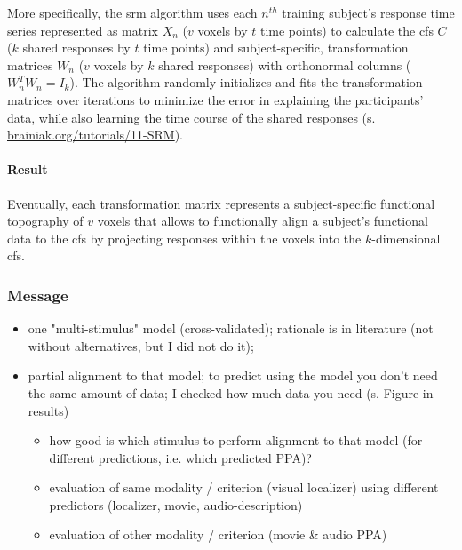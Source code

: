 More specifically, the \ac{srm} algorithm uses each $n^{th}$ training subject's
response time series represented as matrix $X_{n}$ ({$v$} voxels by $t$ time
points) to calculate the \ac{cfs} $C$ ($k$ shared responses by $t$ time points)
and subject-specific, transformation matrices $W_{n}$ ($v$ voxels by $k$ shared
responses) with orthonormal columns ($W_{n}^{T}W_{n}=I_{k}$).
The algorithm randomly initializes and fits the transformation matrices over
iterations to minimize the error in explaining the participants' data, while
also learning the time course of the shared responses (s.
\href{https://brainiak.org/tutorials/11-SRM/}{\url{brainiak.org/tutorials/11-SRM}}).



\paragraph{Result}
Eventually, each transformation matrix represents a subject-specific functional
topography of {$v$} voxels that allows to functionally align a subject's
functional data to the \ac{cfs} by projecting responses within the voxels into
the $k$-dimensional \ac{cfs}.



\subsubsection{Message}


\begin{itemize}
    \item one "multi-stimulus" model (cross-validated); rationale is
        in literature (not without alternatives, but I did not do it);
    \item partial alignment to that model;
        to predict using the model you don't need the same amount of data;
        I checked how much data you need (s. Figure in results)

        \begin{itemize}
            \item how good is which stimulus to perform alignment to that model
                (for different predictions, i.e. which predicted PPA)?
            \item evaluation of same modality / criterion (visual localizer)
                using different predictors (localizer, movie, audio-description)
            \item evaluation of other modality / criterion (movie \& audio PPA)
        \end{itemize}

\end{itemize}



